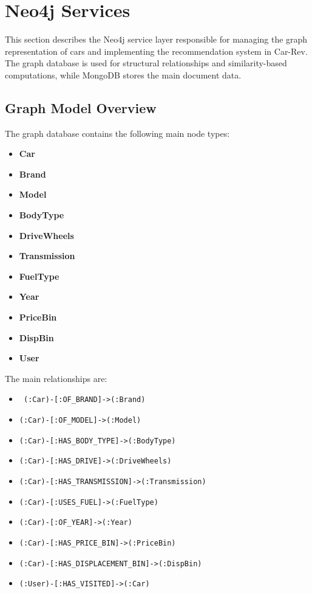 \section{Neo4j Services}

This section describes the Neo4j service layer responsible for managing the graph
representation of cars and implementing the recommendation system in Car-Rev.
The graph database is used for structural relationships and similarity-based
computations, while MongoDB stores the main document data.

\subsection{Graph Model Overview}

The graph database contains the following main node types:

\begin{itemize}
    \item \textbf{Car}
    \item \textbf{Brand}
    \item \textbf{Model}
    \item \textbf{BodyType}
    \item \textbf{DriveWheels}
    \item \textbf{Transmission}
    \item \textbf{FuelType}
    \item \textbf{Year}
    \item \textbf{PriceBin}
    \item \textbf{DispBin}
    \item \textbf{User}
\end{itemize}

The main relationships are:

\begin{itemize}
    \item \texttt{ (:Car)-[:OF_BRAND]->(:Brand)}
    \item \texttt{(:Car)-[:OF_MODEL]->(:Model)}
    \item \texttt{(:Car)-[:HAS_BODY_TYPE]->(:BodyType)}
    \item \texttt{(:Car)-[:HAS_DRIVE]->(:DriveWheels)}
    \item \texttt{(:Car)-[:HAS_TRANSMISSION]->(:Transmission)}
    \item \texttt{(:Car)-[:USES_FUEL]->(:FuelType)}
    \item \texttt{(:Car)-[:OF_YEAR]->(:Year)}
    \item \texttt{(:Car)-[:HAS_PRICE_BIN]->(:PriceBin)}
    \item \texttt{(:Car)-[:HAS_DISPLACEMENT_BIN]->(:DispBin)}
    \item \texttt{(:User)-[:HAS_VISITED]->(:Car)}
\end{itemize}

